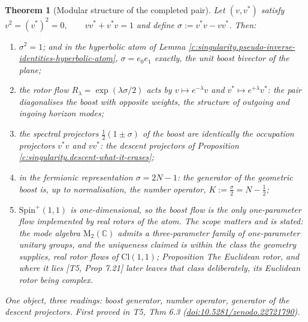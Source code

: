 \documentclass[11pt]{article}
\newtheorem{theorem}{Theorem}[section]
\theoremstyle{definition}
\theoremstyle{plain}
\providecommand{\C}{}\renewcommand{\C}{\mathbb{C}}
\providecommand{\Cl}{}\renewcommand{\Cl}{\mathrm{Cl}}
\providecommand{\Mat}{}\renewcommand{\Mat}{\mathrm{M}}
\begin{document}
\begin{theorem}[Modular structure of the completed pair]\label{c:singularity.modular-structure-completed-pair}
Let $(v, v^*)$ satisfy $v^2 = (v^*)^2 = 0, \qquad v v^* + v^* v = 1$ and define $\sigma := v^* v - v v^*$. Then:
\begin{enumerate}
\item $\sigma^2 = 1$; and in the hyperbolic atom of Lemma \ref{c:singularity.pseudo-inverse-identities-hyperbolic-atom}, $\sigma = e_0 e_1$ exactly, the unit boost bivector of the plane;
\item the rotor flow $R_\lambda = \exp(\lambda\sigma/2)$ acts by $v \mapsto e^{-\lambda} v$ and $v^* \mapsto e^{+\lambda} v^*$: the pair diagonalises the boost with opposite weights, the structure of outgoing and ingoing horizon modes;
\item the spectral projectors $\tfrac12(1 \pm \sigma)$ of the boost are identically the occupation projectors $v^* v$ and $v v^*$: the descent projectors of Proposition \ref{c:singularity.descent-what-it-erases};
\item in the fermionic representation $\sigma = 2N - 1$: the generator of the geometric boost is, up to normalisation, the number operator, $K := \tfrac{\sigma}{2} = N - \tfrac12$;
\item $\mathrm{Spin}^+(1,1)$ is one-dimensional, so the boost flow is the \emph{only} one-parameter flow implemented by real rotors of the atom. The scope matters and is stated: the mode algebra $\Mat_2(\C)$ admits a three-parameter family of one-parameter unitary groups, and the uniqueness claimed is within the class the geometry supplies, real rotor flows of $\Cl(1,1)$; Proposition \emph{The Euclidean rotor, and where it lies} [T5, Prop 7.21] later leaves that class deliberately, its Euclidean rotor being complex.
\end{enumerate}
One object, three readings: boost generator, number operator, generator of the descent projectors.
\emph{First proved in} T5, Thm 6.3 (\href{https://doi.org/10.5281/zenodo.22721790}{doi:10.5281/zenodo.22721790}).
\end{theorem}
\end{document}
